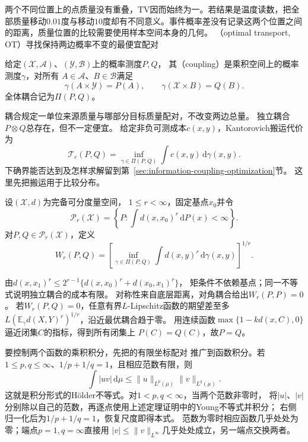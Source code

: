两个不同位置上的点质量没有重叠，TV因而始终为一。若结果是温度读数，把全部质量移动\(0.01\)度与移动\(10\)度却有不同意义。事件概率差没有记录这两个位置之间的距离，质量位置的比较需要使用样本空间本身的几何。
（optimal transport, OT）寻找保持两边概率不变的最便宜配对

\begin{definition}[耦合]
\label{def:information-coupling}
给定\((\mathcal X,\mathcal A)\)、\((\mathcal Y,\mathcal B)\)上的概率测度\(P,Q\)，
其（coupling）是乘积空间上的概率测度\(\gamma\)，对所有
\(A\in\mathcal A\)、\(B\in\mathcal B\)满足
\[
  \gamma(A\times\mathcal Y)=P(A),\qquad
  \gamma(\mathcal X\times B)=Q(B).
\]
全体耦合记为\(\Pi(P,Q)\)。
\end{definition}
耦合规定一单位来源质量与哪部分目标质量配对，不改变两边总量。
独立耦合\(P\otimes Q\)总存在，但不一定便宜。
给定非负可测成本\(c(x,y)\)，Kantorovich搬运代价为
\begin{equation}
  \mathcal T_c(P,Q)=\inf_{\gamma\in\Pi(P,Q)}
                      \int c(x,y)\,\mathrm d\gamma(x,y).
  \label{eq:information-kantorovich-transport}
\end{equation}
下确界能否达到及怎样求解留到第~\ref{sec:information-coupling-optimization}节。
这里先把搬运用于比较分布。

\begin{definition}[Wasserstein距离]
\label{def:information-wasserstein-distance}
设\((\mathcal X,d)\)为完备可分度量空间，
\(1\leq r<\infty\)，固定基点\(x_0\)并令
\[
  \mathcal P_r(\mathcal X)=
   \left\{P:\int d(x,x_0)^r\,\mathrm dP(x)<\infty\right\}.
\]
对\(P,Q\in\mathcal P_r(\mathcal X)\)，定义
\begin{equation}
  W_r(P,Q)=\left[
    \inf_{\gamma\in\Pi(P,Q)}\int d(x,y)^r\,\mathrm d\gamma(x,y)
  \right]^{1/r}.
  \label{eq:information-wasserstein-distance}
\end{equation}
\end{definition}

由\(d(x,x_1)^r\leq2^{r-1}\{d(x,x_0)^r+d(x_0,x_1)^r\}\)，
矩条件不依赖基点；同一不等式说明独立耦合的成本有限。
对称性来自底层距离，对角耦合给出\(W_r(P,P)=0\)。
若\(W_r(P,Q)=0\)，任意有界\(L\)-Lipschitz函数的期望差至多
\(L(\mathbb E_\gamma d(X,Y)^r)^{1/r}\)，沿近最优耦合趋于零。
用连续函数\(\max\{1-kd(x,C),0\}\)逼近闭集\(C\)的指标，得到所有闭集上
\(P(C)=Q(C)\)，故\(P=Q\)。

要控制两个函数的乘积积分，先把的有限坐标配对
推广到函数积分。若\(1\leq p,q\leq\infty\)、\(1/p+1/q=1\)，且相应范数有限，则
\begin{equation}
 \int|uv|\,\mathrm d\mu\leq
 \|u\|_{L^p(\mu)}\|v\|_{L^q(\mu)}.
 \label{eq:information-integral-holder}
\end{equation}
这就是积分形式的Hölder不等式。对\(1<p,q<\infty\)，当两个范数非零时，
将\(|u|\)、\(|v|\)分别除以自己的范数，再逐点使用上述定理证明中的Young不等式并积分；
右侧归一化后为\(1/p+1/q=1\)，恢复尺度即得本式。
范数为零时相应函数几乎处处为零；端点\(p=1,q=\infty\)直接用
\(|v|\leq\|v\|_{L^\infty}\)几乎处处成立，另一端点交换两者。

